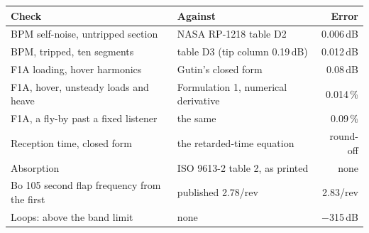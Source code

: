 \begin{tabular}{@{}l@{\hspace{3pt}}l@{\hspace{3pt}}r@{}}
\toprule
Check & Against & Error \\
\midrule
BPM self-noise, untripped section & NASA RP-1218 table D2 & 0.006\,dB \\
BPM, tripped, ten segments & table D3 (tip column 0.19\,dB) & 0.012\,dB \\
F1A loading, hover harmonics & Gutin's closed form & 0.08\,dB \\
F1A, hover, unsteady loads and heave & Formulation 1, numerical derivative & 0.014\,\% \\
F1A, a fly-by past a fixed listener & the same & 0.09\,\% \\
Reception time, closed form & the retarded-time equation & round-off \\
Absorption & ISO 9613-2 table 2, as printed & none \\
Bo 105 second flap frequency from the first & published 2.78/rev & 2.83/rev \\
Loops: above the band limit & none & $-$315\,dB \\
\bottomrule
\end{tabular}
